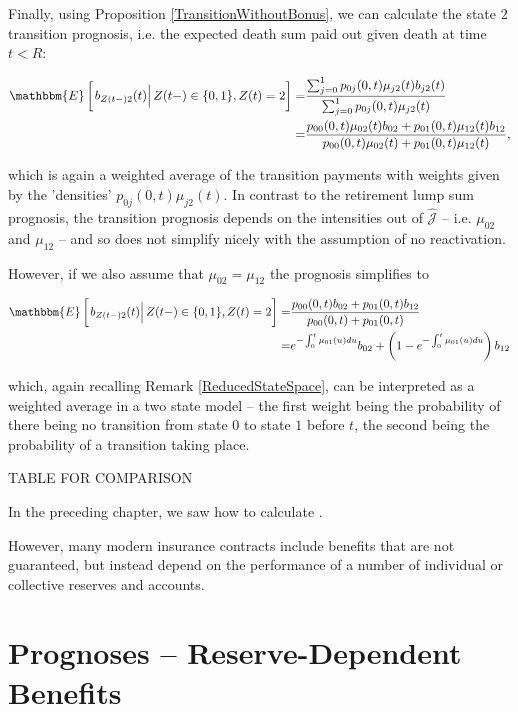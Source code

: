 \documentclass{book}
\newcommand{\1}[1]{\mathbbm{1}_{\left\lbrace #1 \right\rbrace}}
\newcommand{\econd}[2][def]{\mathbbm{E} \left[ \left. #1 \right| #2 \right]}
\theoremstyle{break}
\theoremstyle{remark}
\numberwithin{equation}{section}
\begin{document}
Finally, using Proposition \ref{TransitionWithoutBonus}, we can calculate the state $2$ transition prognosis, i.e. the expected death sum paid out given death at time $t<R$:

\begin{align*}
    \econd[b_{Z(t-)2}(t)]{Z(t-) \in \{ 0,1 \}, Z(t)=2} =& \frac{\sum_{j=0}^1 p_{0j}(0,t) \mu_{j2}(t) b_{j2}(t)}{\sum_{j=0}^1 p_{0j}(0,t) \mu_{j2}(t)} \\
    =&\frac{p_{00}(0,t) \mu_{02}(t) b_{02} + p_{01}(0,t) \mu_{12}(t) b_{12}}{p_{00}(0,t) \mu_{02}(t) + p_{01}(0,t) \mu_{12}(t)},
\end{align*}

which is again a weighted average of the transition payments with weights given by the 'densities' $p_{0j}(0,t) \mu_{j2}(t)$. In contrast to the retirement lump sum prognosis, the transition prognosis depends on the intensities out of $\hat{\mathcal{J}}$ -- i.e. $\mu_{02}$ and $\mu_{12}$ -- and so does not simplify nicely with the assumption of no reactivation.

However, if we also assume that $\mu_{02}=\mu_{12}$ the prognosis simplifies to

\begin{align*}
    \econd[b_{Z(t-)2}(t)]{Z(t-) \in \{ 0,1 \}, Z(t)=2} =&\frac{p_{00}(0,t) b_{02} + p_{01}(0,t) b_{12}}{p_{00}(0,t) + p_{01}(0,t)} \\
    =& e^{-\int_0^t \mu_{01}(u)du} b_{02} + \left(1 - e^{-\int_0^t \mu_{01}(u)du} \right) b_{12}
\end{align*}

which, again recalling Remark \ref{ReducedStateSpace}, can be interpreted as a weighted average in a two state model -- the first weight being the probability of there being no transition from state $0$ to state $1$ before $t$, the second being the probability of a transition taking place.

TABLE FOR COMPARISON

In the preceding chapter, we saw how to calculate .

However, many modern insurance contracts include benefits that are not guaranteed, but instead depend on the performance of a number of individual or collective reserves and accounts. 

\newpage

\chapter{Prognoses -- Reserve-Dependent Benefits} \label{ChapReserveDepBen}
\end{document}
